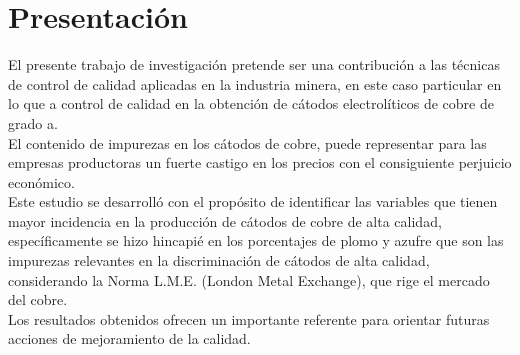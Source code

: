 \chapter{Presentaci\'on}


El presente trabajo de investigaci\'on pretende ser una contribuci\'on a las t\'ecnicas de control de calidad aplicadas en la industria minera, en este caso particular en lo que a control de calidad en la obtenci\'on de c\'atodos electrol\'iticos de cobre de grado a. \\

El contenido de impurezas en los c\'atodos de cobre, puede representar para las empresas productoras un fuerte castigo en los precios con el consiguiente perjuicio econ\'omico. \\

Este estudio se desarroll\'o con el prop\'osito de identificar las variables que tienen mayor incidencia en la producci\'on de c\'atodos de cobre de alta calidad, espec\'ificamente se hizo hincapi\'e en los porcentajes de plomo y azufre que son las impurezas relevantes en la discriminaci\'on de c\'atodos de alta calidad, considerando la Norma L.M.E. (London Metal Exchange), que rige el mercado del cobre.\\

Los resultados obtenidos ofrecen un importante referente para orientar futuras acciones de mejoramiento de la calidad.

\endinput